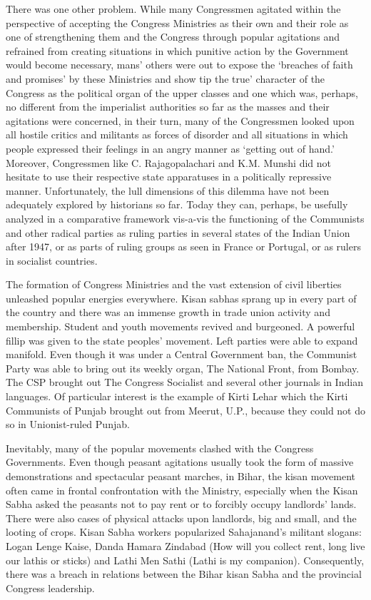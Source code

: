 \begin{multicols}{2}
There was one other problem. While many Congressmen agitated within the perspective of accepting the Congress Ministries as their own and their role as one of strengthening them and the Congress through popular agitations and refrained from creating situations in which punitive action by the Government would become necessary, mans' others were out to expose the `breaches of faith and promises' by these Ministries and show tip the true' character of the Congress as the political organ of the upper classes and one which was, perhaps, no different from the imperialist authorities so far as the masses and their agitations were concerned, in their turn, many of the Congressmen looked upon all hostile critics and militants as forces of disorder and all situations in which people expressed their feelings in an angry manner as `getting out of hand.' Moreover, Congressmen like C. Rajagopalachari and K.M. Munshi did not hesitate to use their respective state apparatuses in a politically repressive manner. Unfortunately, the lull dimensions of this dilemma have not been adequately explored by historians so far. Today they can, perhaps, be usefully analyzed in a comparative framework vis-a-vis the functioning of the Communists and other radical parties as ruling parties in several states of the Indian Union after 1947, or as parts of ruling groups as seen in France or Portugal, or as rulers in socialist countries. 

The formation of Congress Ministries and the vast extension of civil liberties unleashed popular energies everywhere. Kisan sabhas sprang up in every part of the country and there was an immense growth in trade union activity and membership. Student and youth movements revived and burgeoned. A powerful fillip was given to the state peoples' movement. Left parties were able to expand manifold. Even though it was under a Central Government ban, the Communist Party was able to bring out its weekly organ, The National Front, from Bombay. The CSP brought out The Congress Socialist and several other journals in Indian languages. Of particular interest is the example of Kirti Lehar which the Kirti Communists of Punjab brought out from Meerut, U.P., because they could not do so in Unionist-ruled Punjab. 

Inevitably, many of the popular movements clashed with the Congress Governments. Even though peasant agitations usually took the form of massive demonstrations and spectacular peasant marches, in Bihar, the kisan movement often came in frontal confrontation with the Ministry, especially when the Kisan Sabha asked the peasants not to pay rent or to forcibly occupy landlords' lands. There were also cases of physical attacks upon landlords, big and small, and the looting of crops. Kisan Sabha workers popularized Sahajanand's militant slogans: Logan Lenge Kaise, Danda Hamara Zindabad (How will you collect rent, long live our lathis or sticks) and Lathi Men Sathi (Lathi is my companion). Consequently, there was a breach in relations between the Bihar kisan Sabha and the provincial Congress leadership. 


\end{multicols}
